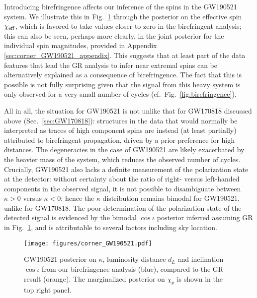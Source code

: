 \documentclass[aps,prd,twocolumn,superscriptaddress,preprintnumbers,floatfix,nofootinbib]{revtex4-2}
\begin{document}
Introducing birefringence affects our inference of the spins in the GW190521 system.
We illustrate this in Fig.~\ref{fig:corner_GW190521} through the posterior on the effective spin $\chi_{\rm eff}$, which is favored to take values closer to zero in the birefringent analysis;
this can also be seen, perhaps more clearly, in the joint posterior for the individual spin magnitudes, provided in Appendix \ref{sec:corner_GW190521_appendix}.
This suggests that at least part of the data features that lead the \ac{GR} analysis to infer near extremal spins can be alternatively explained as a consequence of birefringence.
The fact that this is possible is not fully surprising given that the signal from this heavy system is only observed for a very small number of cycles \cite{LIGOScientific:2020iuh,LIGOScientific:2020ufj} (cf.~Fig.~\ref{fig:birefringence}).

All in all, the situation for GW190521 is not unlike that for GW170818 discussed above (Sec.~\ref{sec:GW170818}): structures in the data that would normally be interpreted as traces of high component spins are instead (at least partially) attributed to birefringent propagation, driven by a prior preference for high distances.
The degeneracies in the case of GW190521 are likely exacerbated by the heavier mass of the system, which reduces the observed number of cycles.
Crucially, GW190521 also lacks a definite measurement of the polarization state at the detector: without certainty about the ratio of right- versus left-handed components in the observed signal, it is not possible to disambiguate between $\kappa > 0$ versus $\kappa < 0$; hence the $\kappa$ distribution remains bimodal for GW190521, unlike for GW170818.
The poor determination of the polarization state of the detected signal is evidenced by the bimodal $\cos\iota$ posterior inferred assuming \ac{GR} in Fig.~\ref{fig:corner_GW190521}, and is attributable to several factors including sky location.

\begin{figure}
    \texttt{[image: figures/corner\_GW190521.pdf]}
    \caption{
        GW190521 posterior on $\kappa$, luminosity distance $d_L$ and inclination $\cos\iota$ from our birefringence analysis (blue), compared to the GR result (orange).
        The marginalized posterior on $\chi_p$ is shown in the top right panel.
    }
    \label{fig:corner_GW190521}
\end{figure}
\end{document}
